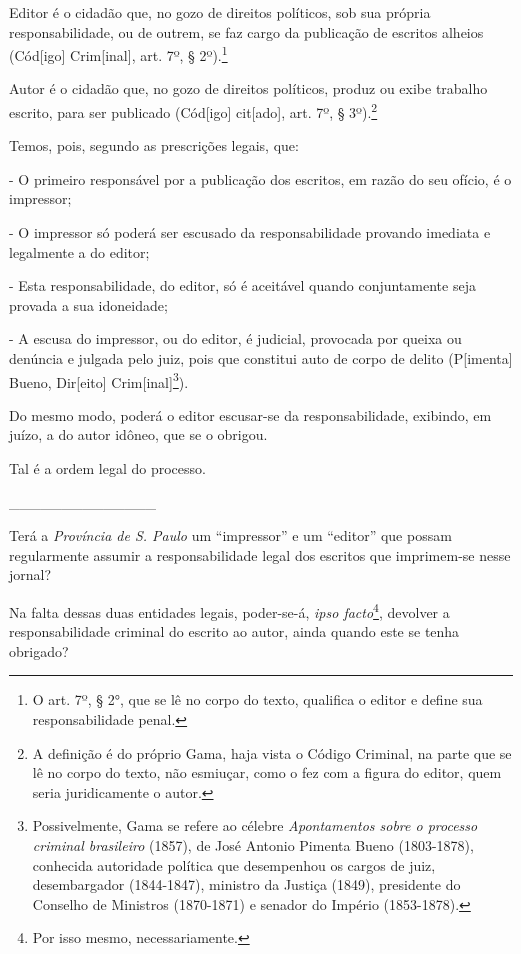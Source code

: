 Editor é o cidadão que, no gozo de direitos políticos, sob sua própria
responsabilidade, ou de outrem, se faz cargo da publicação de escritos
alheios (Cód{[}igo{]} Crim{[}inal{]}, art. 7º, § 2º).\footnote{O art.
  7º, § 2°, que se lê no corpo do texto, qualifica o editor e define sua
  responsabilidade penal.}

Autor é o cidadão que, no gozo de direitos políticos, produz ou exibe
trabalho escrito, para ser publicado (Cód{[}igo{]} cit{[}ado{]}, art.
7º, § 3º).\footnote{A definição é do próprio Gama, haja vista o Código
  Criminal, na parte que se lê no corpo do texto, não esmiuçar, como o
  fez com a figura do editor, quem seria juridicamente o autor.}

Temos, pois, segundo as prescrições legais, que:

- O primeiro responsável por a publicação dos escritos, em razão do seu
ofício, é o impressor;

- O impressor só poderá ser escusado da responsabilidade provando
imediata e legalmente a do editor;

- Esta responsabilidade, do editor, só é aceitável quando conjuntamente
seja provada a sua idoneidade;

- A escusa do impressor, ou do editor, é judicial, provocada por queixa
ou denúncia e julgada pelo juiz, pois que constitui auto de corpo de
delito (P{[}imenta{]} Bueno, Dir{[}eito{]} Crim{[}inal{]}\footnote{Possivelmente,
  Gama se refere ao célebre \emph{Apontamentos sobre o processo criminal
  brasileiro} (1857), de José Antonio Pimenta Bueno (1803-1878),
  conhecida autoridade política que desempenhou os cargos de juiz,
  desembargador (1844-1847), ministro da Justiça (1849), presidente do
  Conselho de Ministros (1870-1871) e senador do Império (1853-1878).}).

Do mesmo modo, poderá o editor escusar-se da responsabilidade, exibindo,
em juízo, a do autor idôneo, que se o obrigou.

Tal é a ordem legal do processo.

\_\_\_\_\_\_\_\_\_\_\_\_\_\_

Terá a \emph{Província de S. Paulo} um ``impressor'' e um ``editor'' que
possam regularmente assumir a responsabilidade legal dos escritos que
imprimem-se nesse jornal?

Na falta dessas duas entidades legais, poder-se-á, \emph{ipso
facto}\footnote{Por isso mesmo, necessariamente.}, devolver a
responsabilidade criminal do escrito ao autor, ainda quando este se
tenha obrigado?

